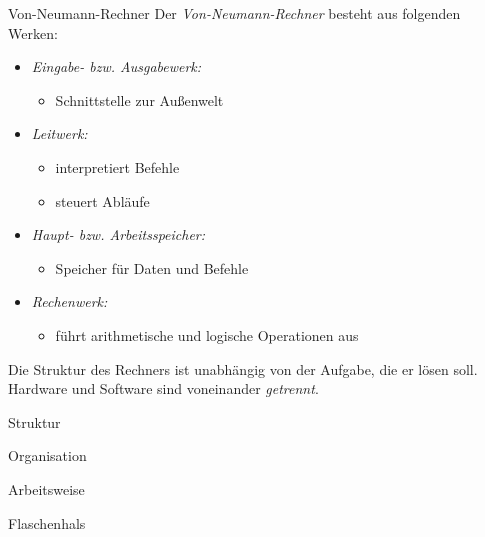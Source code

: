 \begin{defi}{Von-Neumann-Rechner}
    Der \emph{Von-Neumann-Rechner} besteht aus folgenden Werken:
    \begin{itemize}
        \item \emph{Eingabe- bzw. Ausgabewerk:}
              \begin{itemize}
                  \item Schnittstelle zur Außenwelt
              \end{itemize}
        \item \emph{Leitwerk:}
              \begin{itemize}
                  \item interpretiert Befehle
                  \item steuert Abläufe
              \end{itemize}
        \item \emph{Haupt- bzw. Arbeitsspeicher:}
              \begin{itemize}
                  \item Speicher für Daten und Befehle
              \end{itemize}
        \item \emph{Rechenwerk:}
              \begin{itemize}
                  \item führt arithmetische und logische Operationen aus
              \end{itemize}
    \end{itemize}

    Die Struktur des Rechners ist unabhängig von der Aufgabe, die er lösen soll.
    Hardware und Software sind voneinander \emph{getrennt}.
\end{defi}

\begin{defi}{Struktur}

\end{defi}

\begin{defi}{Organisation}

\end{defi}

\begin{defi}{Arbeitsweise}

\end{defi}

\begin{defi}{Flaschenhals}

\end{defi}

